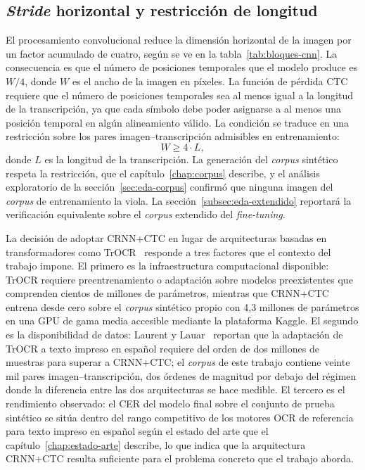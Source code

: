 \subsection{\textit{Stride} horizontal y restricción de longitud}
\label{subsec:stride-restriccion}

El procesamiento convolucional reduce la dimensión horizontal de la imagen por un factor acumulado de cuatro, según se ve en la tabla~\ref{tab:bloques-cnn}. La consecuencia es que el número de posiciones temporales que el modelo produce es $W/4$, donde $W$ es el ancho de la imagen en píxeles. La función de pérdida CTC requiere que el número de posiciones temporales sea al menos igual a la longitud de la transcripción, ya que cada símbolo debe poder asignarse a al menos una posición temporal en algún alineamiento válido. La condición se traduce en una restricción sobre los pares imagen--transcripción admisibles en entrenamiento:
\begin{equation}
	W \geq 4 \cdot L,
\end{equation}
donde $L$ es la longitud de la transcripción. La generación del \textit{corpus} sintético respeta la restricción, que el capítulo~\ref{chap:corpus} describe, y el análisis exploratorio de la sección~\ref{sec:eda-corpus} confirmó que ninguna imagen del \textit{corpus} de entrenamiento la viola. La sección~\ref{subsec:eda-extendido} reportará la verificación equivalente sobre el \textit{corpus} extendido del \textit{fine-tuning}.

La decisión de adoptar CRNN+CTC en lugar de arquitecturas basadas en transformadores como TrOCR~\cite{li2021trocr} responde a tres factores que el contexto del trabajo impone. El primero es la infraestructura computacional disponible: TrOCR requiere preentrenamiento o adaptación sobre modelos preexistentes que comprenden cientos de millones de parámetros, mientras que CRNN+CTC entrena desde cero sobre el \textit{corpus} sintético propio con 4{,}3 millones de parámetros en una GPU de gama media accesible mediante la plataforma Kaggle. El segundo es la disponibilidad de datos: Laurent y Lauar~\cite{laurent2024spanishtrocr} reportan que la adaptación de TrOCR a texto impreso en español requiere del orden de dos millones de muestras para superar a CRNN+CTC; el \textit{corpus} de este trabajo contiene veinte mil pares imagen--transcripción, dos órdenes de magnitud por debajo del régimen donde la diferencia entre las dos arquitecturas se hace medible. El tercero es el rendimiento observado: el CER del modelo final sobre el conjunto de prueba sintético se sitúa dentro del rango competitivo de los motores OCR de referencia para texto impreso en español según el estado del arte que el capítulo~\ref{chap:estado-arte} describe, lo que indica que la arquitectura CRNN+CTC resulta suficiente para el problema concreto que el trabajo aborda.

